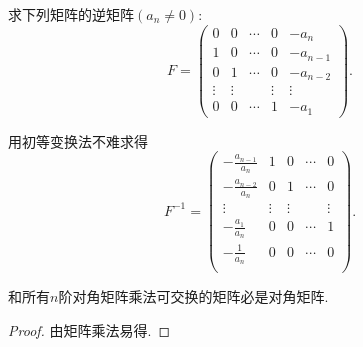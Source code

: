 \documentclass[../../main.tex]{subfiles}%
\begin{document}
\begin{example}
求下列矩阵的逆矩阵\((a_n\neq0)\):
\[
F = 
\begin{pmatrix}
0 & 0 & \cdots & 0 & -a_n\\
1 & 0 & \cdots & 0 & -a_{n - 1}\\
0 & 1 & \cdots & 0 & -a_{n - 2}\\
\vdots & \vdots & & \vdots & \vdots\\
0 & 0 & \cdots & 1 & -a_1
\end{pmatrix}.
\]
\end{example}
\begin{solution}
用初等变换法不难求得
\[
F^{-1}=\left( \begin{matrix}
-\frac{a_{n-1}}{a_n}&		1&		0&		\cdots&		0\\
-\frac{a_{n-2}}{a_n}&		0&		1&		\cdots&		0\\
\vdots&		\vdots&		\vdots&		&		\vdots\\
-\frac{a_1}{a_n}&		0&		0&		\cdots&		1\\
-\frac{1}{a_n}&		0&		0&		\cdots&		0\\
\end{matrix} \right) .
\]

\end{solution}


\begin{proposition}\label{proposition:与对角矩阵可交换的矩阵必是对角阵}
和所有$n$阶对角矩阵乘法可交换的矩阵必是对角矩阵.
\end{proposition}
\begin{proof}
由矩阵乘法易得.
\end{proof}
\end{document}
